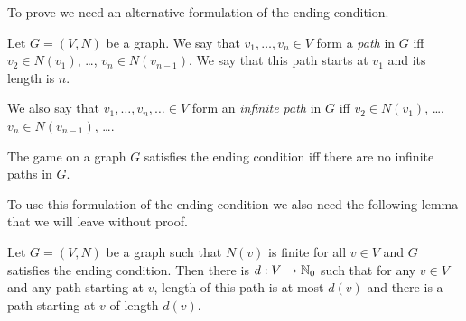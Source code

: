 To prove  we need an alternative
formulation of the ending condition. 
\begin{definition}
  Let $G = (V, N)$ be a graph. We say that $v_1, \dots, v_n \in V$ form a
  \emph{path} in $G$ iff $v_2 \in N(v_1)$, \dots, $v_n \in N(v_{n - 1})$.
  We say that this path starts at $v_1$ and its length is $n$.

  We also say that $v_1, \dots, v_n, \dots \in V$ form an \emph{infinite path}
  in $G$ iff $v_2 \in N(v_1)$, \dots, $v_n \in N(v_{n - 1})$, \dots.
\end{definition}

\begin{remark}
  The game on a graph $G$ satisfies the ending condition iff there are no
  infinite paths in $G$.
\end{remark}

To use this formulation of the ending condition we also need the following lemma
that we will leave without proof.
\begin{lemma}[K\H{o}nig]
\label{lemma:konig}
  Let $G = (V, N)$ be a graph such that $N(v)$ is finite for all $v \in V$ and
  $G$ satisfies the ending condition. Then there is $d : V \to {\mathbb{N}}_0$ such that
  for any $v \in V$ and any path starting at $v$, length of this path is at
  most $d(v)$ and there is a path starting at $v$ of length $d(v)$.
\end{lemma}

